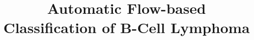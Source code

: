 \documentclass[11pt,a4paper]{article}
\begin{document}
\title{Automatic Flow-based Classification of B-Cell Lymphoma}
\end{document}
